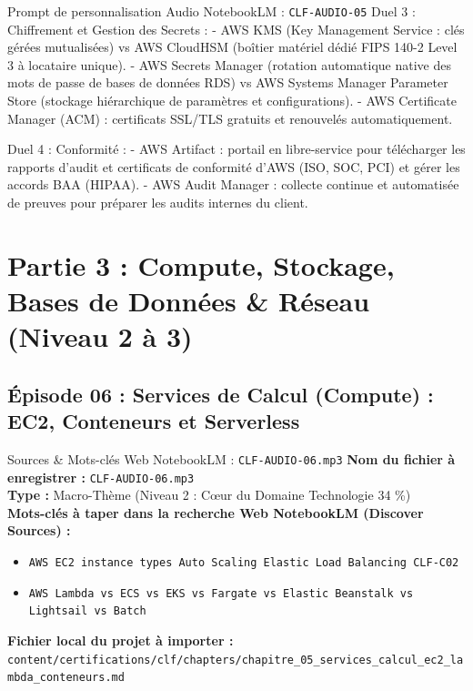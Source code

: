 \documentclass[11pt,a4paper]{article}
\begin{document}
\begin{promptbox}{Prompt de personnalisation Audio NotebookLM : \texttt{CLF-AUDIO-05}}
Duel 3 : Chiffrement et Gestion des Secrets :
- AWS KMS (Key Management Service : clés gérées mutualisées) vs AWS CloudHSM (boîtier matériel dédié FIPS 140-2 Level 3 à locataire unique).
- AWS Secrets Manager (rotation automatique native des mots de passe de bases de données RDS) vs AWS Systems Manager Parameter Store (stockage hiérarchique de paramètres et configurations).
- AWS Certificate Manager (ACM) : certificats SSL/TLS gratuits et renouvelés automatiquement.

Duel 4 : Conformité :
- AWS Artifact : portail en libre-service pour télécharger les rapports d'audit et certificats de conformité d'AWS (ISO, SOC, PCI) et gérer les accords BAA (HIPAA).
- AWS Audit Manager : collecte continue et automatisée de preuves pour préparer les audits internes du client.
\end{promptbox}

\newpage

\section{Partie 3 : Compute, Stockage, Bases de Données \& Réseau (Niveau 2 à 3)}

\subsection{Épisode 06 : Services de Calcul (Compute) : EC2, Conteneurs et Serverless}
\begin{sourcebox}{Sources \& Mots-clés Web NotebookLM : \texttt{CLF-AUDIO-06.mp3}}
\textbf{Nom du fichier à enregistrer :} \texttt{CLF-AUDIO-06.mp3}\\
\textbf{Type :} Macro-Thème (Niveau 2 : Cœur du Domaine Technologie 34 \%)\\
\textbf{Mots-clés à taper dans la recherche Web NotebookLM (Discover Sources) :}
\begin{itemize}[noitemsep]
    \item \texttt{AWS EC2 instance types Auto Scaling Elastic Load Balancing CLF-C02}
    \item \texttt{AWS Lambda vs ECS vs EKS vs Fargate vs Elastic Beanstalk vs Lightsail vs Batch}
\end{itemize}
\textbf{Fichier local du projet à importer :}
\texttt{content/certifications/clf/chapters/chapitre_05_services_calcul_ec2_lambda_conteneurs.md}
\end{sourcebox}
\end{document}
